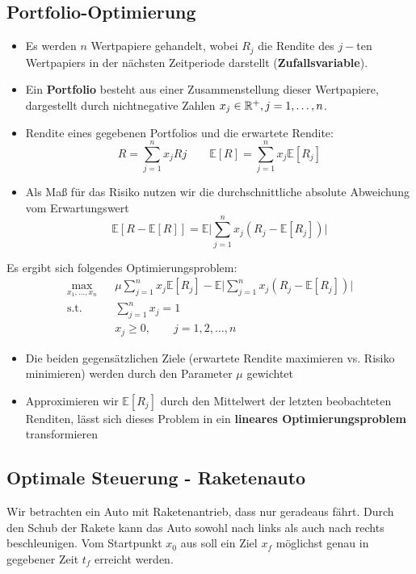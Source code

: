 \subsection{Portfolio-Optimierung}
\begin{itemize}
	\item Es werden $n$ Wertpapiere gehandelt, wobei $R_j$ die Rendite des $j-$ten Wertpapiers in der n\"achsten Zeitperiode darstellt (\textbf{Zufallsvariable}).
	\item Ein \textbf{Portfolio} besteht aus einer Zusammenstellung dieser Wertpapiere, dargestellt durch nichtnegative Zahlen $x_j\in\mathbb R^+,j=1,\dots,n$.
	\item Rendite eines gegebenen Portfolios und die erwartete Rendite:
	\begin{equation*}
		R=\sum\limits_{j=1}^n x_jRj \qquad \mathbb{E}[R]=\sum\limits_{j=1}^n x_j\mathbb{E}[R_j]
	\end{equation*}
	\item Als Ma\ss{}  f\"ur das Risiko nutzen wir die durchschnittliche absolute Abweichung vom Erwartungswert
	\begin{equation*}
		\mathbb{E}[R-\mathbb{E}[R]]=\mathbb{E}\Bigg\lvert\sum\limits_{j=1}^n x_j (R_j-\mathbb{E}[R_j])\Bigg\rvert
	\end{equation*}
\end{itemize}
Es ergibt sich folgendes Optimierungsproblem:
\begin{eqnarray*}
		\max_{x_1,\dots,x_n} & &\mu\sum\limits_{j=1}^nx_j \mathbb{E}[R_j] - \mathbb{E}\Bigg\lvert\sum\limits_{j=1}^n x_j (R_j-\mathbb{E}[R_j])\Bigg\rvert\\
		\text{s.t.} & & \sum\limits_{j=1}^n x_j = 1\\
		& & x_j \geq 0, \qquad j=1,2,\dots,n
\end{eqnarray*}

\begin{itemize}
	\item Die beiden gegens\"atzlichen Ziele (erwartete Rendite maximieren vs. Risiko minimieren) werden durch den Parameter $\mu$ gewichtet
	\item Approximieren wir $\mathbb{E}[R_j]$ durch den Mittelwert der letzten beobachteten Renditen, l\"asst sich dieses Problem in ein \textbf{lineares Optimierungsproblem} transformieren
\end{itemize}

\subsection{Optimale Steuerung - Raketenauto}
Wir betrachten ein Auto mit Raketenantrieb, dass nur geradeaus f\"ahrt. Durch den Schub der Rakete kann das Auto sowohl nach links als auch nach rechts beschleunigen. Vom Startpunkt $x_0$ aus soll ein Ziel $x_f$ m\"oglichst genau in gegebener Zeit $t_f$ erreicht werden.
  
